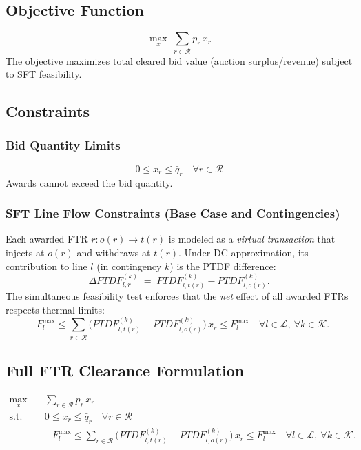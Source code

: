 \documentclass[11pt]{article}
\begin{document}
\subsection{Objective Function}
\begin{equation}
\max_{x}\ \sum_{r\in\mathcal{R}} p_r\,x_r
\tag{1}
\end{equation}
The objective maximizes total cleared bid value (auction surplus/revenue) subject to SFT feasibility.

\subsection{Constraints}

\subsubsection{Bid Quantity Limits}
\begin{equation}
0 \le x_r \le \bar q_r \quad \forall r\in\mathcal{R}
\tag{2}
\end{equation}
Awards cannot exceed the bid quantity.

\subsubsection{SFT Line Flow Constraints (Base Case and Contingencies)}
Each awarded FTR $r: o(r)\to t(r)$ is modeled as a \emph{virtual transaction} that injects at $o(r)$ and
withdraws at $t(r)$. Under DC approximation, its contribution to line $l$ (in contingency $k$) is the PTDF
difference:
\[
\Delta PTDF^{(k)}_{l,r} \;=\; PTDF^{(k)}_{l,t(r)} - PTDF^{(k)}_{l,o(r)}.
\]
The simultaneous feasibility test enforces that the \emph{net} effect of all awarded FTRs respects thermal limits:
\begin{equation}
- F_l^{\max}
\le
\sum_{r\in\mathcal{R}} \Big( PTDF^{(k)}_{l,t(r)} - PTDF^{(k)}_{l,o(r)} \Big)\,x_r
\le
F_l^{\max}
\quad \forall l\in\mathcal{L},\ \forall k\in\mathcal{K}.
\tag{3}
\end{equation}

\subsection{Full FTR Clearance Formulation}
\begin{align}
\max_{x}\quad & \sum_{r\in\mathcal{R}} p_r\,x_r
\tag{4}\\[4pt]
\text{s.t.}\quad
& 0 \le x_r \le \bar q_r \quad \forall r\in\mathcal{R}
\tag{5}\\[4pt]
& - F_l^{\max}
\le
\sum_{r\in\mathcal{R}} \Big( PTDF^{(k)}_{l,t(r)} - PTDF^{(k)}_{l,o(r)} \Big)\,x_r
\le
F_l^{\max}
\quad \forall l\in\mathcal{L},\ \forall k\in\mathcal{K}.
\tag{6}
\end{align}
\end{document}
